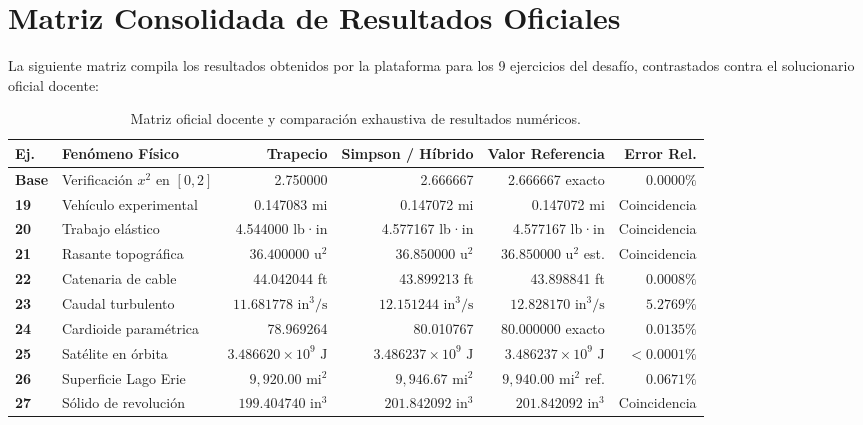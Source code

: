 \documentclass[11pt,a4paper]{article}
\begin{document}
\section{Matriz Consolidada de Resultados Oficiales}

La siguiente matriz compila los resultados obtenidos por la plataforma para los 9 ejercicios del desafío, contrastados contra el solucionario oficial docente:

\begin{table}[h!]
\centering
\small
\caption{Matriz oficial docente y comparación exhaustiva de resultados numéricos.}
\begin{tabularx}{\textwidth}{llrrrr}
\toprule
\textbf{Ej.} & \textbf{Fenómeno Físico} & \textbf{Trapecio} & \textbf{Simpson / Híbrido} & \textbf{Valor Referencia} & \textbf{Error Rel.} \\
\midrule
\textbf{Base} & Verificación $x^2$ en $[0, 2]$ & 2.750000 & 2.666667 & 2.666667 exacto & $0.0000\%$ \\
\textbf{19} & Vehículo experimental & 0.147083 mi & 0.147072 mi & 0.147072 mi & Coincidencia \\
\textbf{20} & Trabajo elástico & 4.544000 lb·in & 4.577167 lb·in & 4.577167 lb·in & Coincidencia \\
\textbf{21} & Rasante topográfica & $36.400000\text{ u}^2$ & $36.850000\text{ u}^2$ & $36.850000\text{ u}^2$ est. & Coincidencia \\
\textbf{22} & Catenaria de cable & 44.042044 ft & 43.899213 ft & 43.898841 ft & $0.0008\%$ \\
\textbf{23} & Caudal turbulento & $11.681778\text{ in}^3/\text{s}$ & $12.151244\text{ in}^3/\text{s}$ & $12.828170\text{ in}^3/\text{s}$ & $5.2769\%$ \\
\textbf{24} & Cardioide paramétrica & 78.969264 & 80.010767 & 80.000000 exacto & $0.0135\%$ \\
\textbf{25} & Satélite en órbita & $3.486620 \times 10^9\text{ J}$ & $3.486237 \times 10^9\text{ J}$ & $3.486237 \times 10^9\text{ J}$ & $< 0.0001\%$ \\
\textbf{26} & Superficie Lago Erie & $9,920.00\text{ mi}^2$ & $9,946.67\text{ mi}^2$ & $9,940.00\text{ mi}^2$ ref. & $0.0671\%$ \\
\textbf{27} & Sólido de revolución & $199.404740\text{ in}^3$ & $201.842092\text{ in}^3$ & $201.842092\text{ in}^3$ & Coincidencia \\
\bottomrule
\end{tabularx}
\end{table}
\end{document}
